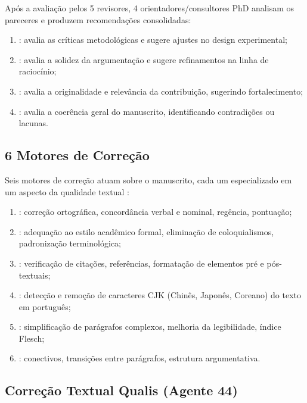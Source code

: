 Após a avaliação pelos 5 revisores, 4 orientadores/consultores PhD analisam
os pareceres e produzem recomendações consolidadas:

\begin{enumerate}
\item {}: avalia as críticas metodológicas
      e sugere ajustes no design experimental;
\item {}: avalia a solidez da
      argumentação e sugere refinamentos na linha de raciocínio;
\item {}: avalia a originalidade e
      relevância da contribuição, sugerindo fortalecimento;
\item {}: avalia a coerência geral do
      manuscrito, identificando contradições ou lacunas.
\end{enumerate}

\subsection{6 Motores de Correção}

Seis motores de correção atuam sobre o manuscrito, cada um especializado em
um aspecto da qualidade textual \cite{opencode2026scanner}:

\begin{enumerate}
\item {}: correção ortográfica, concordância
      verbal e nominal, regência, pontuação;
\item {}: adequação ao estilo acadêmico formal,
      eliminação de coloquialismos, padronização terminológica;
\item {}: verificação de citações, referências,
      formatação de elementos pré e pós-textuais;
\item {}: detecção e remoção de caracteres CJK
      (Chinês, Japonês, Coreano) do texto em português;
\item {}: simplificação de parágrafos complexos,
      melhoria da legibilidade, índice Flesch;
\item {}: conectivos, transições entre parágrafos,
      estrutura argumentativa.
\end{enumerate}

\subsection{Correção Textual Qualis (Agente 44)}

